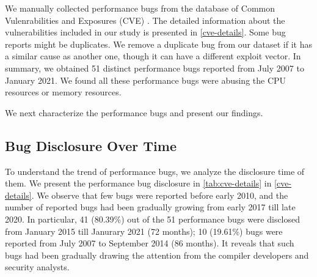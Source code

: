 We manually collected performance bugs from the database of Common Vulenrabilities and Exposures (CVE) \cite{cve}.
%
The detailed information about the vulnerabilities included in our study is presented in \autoref{cve-details}.
%
Some bug reports might be duplicates.
%
We remove a duplicate bug from our dataset if it has a similar cause as another one,
%
though it can have a different exploit vector.
%
In summary, we obtained 51 distinct performance bugs reported from July 2007 to January 2021.
%
We found all these performance bugs were abusing the CPU resources or memory resources.
%

We next characterize the performance bugs and present our findings.

\subsection{Bug Disclosure Over Time}
\label{s:study-time}

To understand the trend of performance bugs, we analyze the disclosure time of them.  
We present the performance bug disclosure in \autoref{tab:cve-details} in \autoref{cve-details}.
%
We observe that few bugs were reported before early 2010, and the number of reported bugs had been gradually growing from early 2017 till late 2020.
%
In particular, 41 (80.39\%) out of the 51 performance bugs were disclosed from January 2015 till Janurary 2021 (72 months);
%
10 (19.61\%) bugs were reported from July 2007 to September 2014 (86 months).
%
It reveals that such bugs had been gradually drawing the attention from the compiler developers and security analysts.
%

